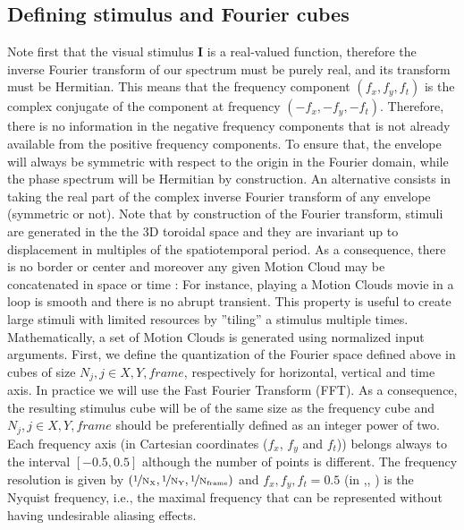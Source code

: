 \documentclass[a4paper,11pt]{article}%
\begin{document}
\subsection{Defining stimulus and Fourier cubes}
Note first that the visual stimulus $\mathbf{I}$ is a real-valued function, therefore the inverse Fourier transform of our spectrum must be purely real, and its transform must be Hermitian. This means that the frequency component $(f_x,f_y,f_t)$ is the complex conjugate of the component at frequency $(-f_x,-f_y,-f_t)$. Therefore, there is no information in the negative frequency components that is not already available from the positive frequency components. 
To ensure that, the envelope will always be symmetric with respect to the origin in the Fourier domain, while the phase spectrum will be Hermitian by construction.  An alternative consists in taking the real part of the complex inverse Fourier transform of any envelope (symmetric or not). 
Note that by construction of the Fourier transform, stimuli are generated in the the 3D toroidal space and they are invariant up to displacement in multiples of the spatiotemporal period. As a consequence, there is no border or center and moreover any given Motion Cloud may be concatenated in space or time : For instance, playing a Motion Clouds movie in a loop is smooth and there is no abrupt transient. This property is useful to create large stimuli with limited resources by ''tiling'' a stimulus multiple times. Mathematically, a set of Motion Clouds is generated using normalized input arguments. First, we define the quantization of the Fourier space defined above in cubes of size $N_j, j \in {X,Y,frame}$, respectively for horizontal, vertical and time axis. 
In practice we will use the Fast Fourier Transform (FFT). As a consequence, the resulting stimulus cube will be of the same size as the frequency cube  and $N_j, j \in {X,Y,frame}$  should be preferentially defined as an integer power of two. Each frequency axis (in Cartesian coordinates ($f_{x}$, $f_{y}$ and $f_{t}$)) belongs always to the interval $[-0.5,0.5]$ although the number of points is different. The frequency resolution is given by $\left( \unitfrac{1}{N_X}, \unitfrac{1}{N_Y}, \unitfrac{1}{N_{frame}}\right)$ and $f_x,f_y,f_t=0.5$ (in  ,, ) is the Nyquist frequency, i.e., the maximal frequency that can be represented without having undesirable aliasing effects. %
\end{document}
